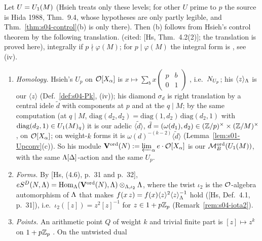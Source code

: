 \begin{remark}\label{rem:s04-controlb}
Let $U=U_1(M)$ (Hsieh treats only these levels; for other $U$ prime to $p$ the source is Hida 1988, Thm.~9.4, whose hypotheses are only
partly legible, and Thm.~\ref{thm:s04-control}(b) is only \stexp{} there). Then (b) follows from Hsieh's control theorem by the following
translation. \stpmc{} (cited: [Hs, Thm.~4.2(2)]; the translation is proved here), integrally if $p\nmid\varphi(M)$; for $p\mid\varphi(M)$
the integral form is \stsketch, see (iv).
\begin{enumerate}[label=(\roman*)]
\item \emph{Homology.} Hsieh's $U_p$ on $\mathcal{O}[X_\alpha]$ is $x\mapsto\sum_bx\left(\begin{smallmatrix}p&b\\0&1\end{smallmatrix}\right)$
  , i.e.\ $N_{U_p}$; his $\langle z\rangle_\Lambda$ is our
  $\langle z\rangle$ (Def.~\ref{def:s04-Pk}, (iv)); his diamond $\sigma_d$ is right translation by a central idele $\tilde d$ with components at $p$ and at the $q\mid M$; by the same
  computation (at $q\mid M$, $\mathrm{diag}(d_2,d_2)=\mathrm{diag}(1,d_2)\,\mathrm{diag}(d_2,1)$ with $\mathrm{diag}(d_2,1)\in U_1(M)_q$) it is our
  adelic $\langle\tilde d\rangle$, $\tilde d=(\omega(d_1),d_2)\in(\mathbb{Z}/p)^\times\times(\mathbb{Z}/M)^\times$, on $\mathcal{O}[X_\alpha]$; on weight-$k$ forms it is
  $\omega(d)^{-(k-2)}\langle\tilde d\rangle$ (Lemma~\ref{lem:s01-Upconv}(c)). So his module
  $\mathbf V^{\rm ord}(N):=\varprojlim_\alpha e\cdot\mathcal{O}[X_\alpha]$
   is our $\mathcal{M}^{\mathrm{ord}}_B(U_1(M))$, with the
  same $\Lambda[\Delta]$-action and the same $U_p$.
\item \emph{Forms.} By [Hs, (4.6), p.~31 and p.~32], $eS^D(N,\Lambda)=\operatorname{Hom}_\Lambda(\mathbf V^{\rm ord}(N),\Lambda)\otimes_{\Lambda,\iota_2}\Lambda$, where the
  twist $\iota_2$ is the $\mathcal{O}$-algebra automorphism of $\Lambda$ that makes $f(x\,z)=f(x)\langle z\rangle^2\langle z\rangle_\Lambda^{-1}$ hold
  ([Hs, Def.~4.1, p.~31]), i.e.\ $\iota_2([z])=z^2[z]^{-1}$ for $z\in1+p\mathbb{Z}_p$ (Remark~\ref{rem:s04-iota2}).
\item \emph{Points.} An arithmetic point $Q$ of weight $k$ and trivial finite part is $[z]\mapsto z^k$ on $1+p\mathbb{Z}_p$
  . On the untwisted dual

\end{enumerate}
\end{remark}
